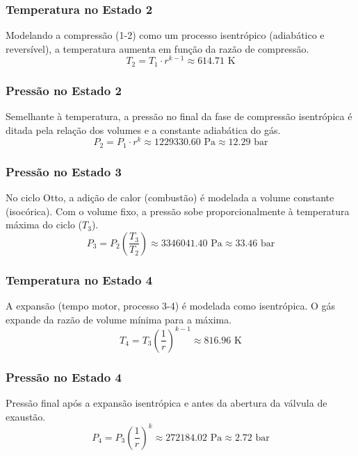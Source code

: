 \subsubsection*{Temperatura no Estado 2}
\noindent Modelando a compressão (1-2) como um processo isentrópico (adiabático e reversível), a temperatura aumenta em função da razão de compressão.
\[ T_{2} = T_{1} \cdot r^{k - 1} \approx 614.71 \text{ K} \]
\vspace{6pt}

\subsubsection*{Pressão no Estado 2}
\noindent Semelhante à temperatura, a pressão no final da fase de compressão isentrópica é ditada pela relação dos volumes e a constante adiabática do gás.
\[ P_{2} = P_{1} \cdot r^{k} \approx 1229330.60 \text{ Pa} \approx 12.29 \text{ bar} \]
\vspace{6pt}

\subsubsection*{Pressão no Estado 3}
\noindent No ciclo Otto, a adição de calor (combustão) é modelada a volume constante (isocórica). Com o volume fixo, a pressão sobe proporcionalmente à temperatura máxima do ciclo ($T_3$).
\[ P_{3} = P_{2} \left(\frac{T_{3}}{T_{2}}\right) \approx 3346041.40 \text{ Pa} \approx 33.46 \text{ bar} \]
\vspace{6pt}

\subsubsection*{Temperatura no Estado 4}
\noindent A expansão (tempo motor, processo 3-4) é modelada como isentrópica. O gás expande da razão de volume mínima para a máxima.
\[ T_{4} = T_{3} \left(\frac{1}{r}\right)^{k - 1} \approx 816.96 \text{ K} \]
\vspace{6pt}

\subsubsection*{Pressão no Estado 4}
\noindent Pressão final após a expansão isentrópica e antes da abertura da válvula de exaustão.
\[ P_{4} = P_{3} \left(\frac{1}{r}\right)^{k} \approx 272184.02 \text{ Pa} \approx 2.72 \text{ bar} \]
\vspace{6pt}

